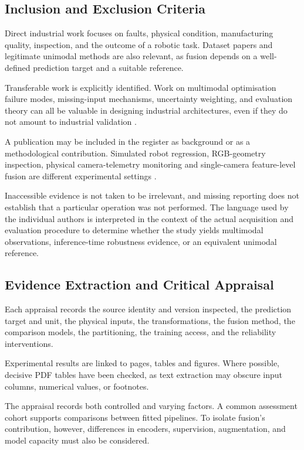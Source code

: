 \subsection{Inclusion and Exclusion Criteria}

Direct industrial work focuses on faults, physical condition, manufacturing quality, inspection, and
the outcome of a robotic task. Dataset papers and legitimate unimodal methods are also relevant, as
fusion depends on a well-defined prediction target and a suitable reference.

Transferable work is explicitly identified. Work on multimodal optimisation failure modes,
missing-input mechanisms, uncertainty weighting, and evaluation theory can all be valuable in
designing industrial architectures, even if they do not amount to industrial validation
\citep{Wang2020What,P016,P023,Bengio2004CVVariance}.

A publication may be included in the register as background or as a methodological contribution.
Simulated robot regression, RGB-geometry inspection, physical camera-telemetry monitoring and
single-camera feature-level fusion are different experimental settings
\citep{Altinses2023Fuzzy,P026,Thoduka2024Handover,P035}.

Inaccessible evidence is not taken to be irrelevant, and missing reporting does not establish that a
particular operation was not performed. The language used by the individual authors is interpreted
in the context of the actual acquisition and evaluation procedure to determine whether the study
yields multimodal observations, inference-time robustness evidence, or an equivalent unimodal
reference.

\subsection{Evidence Extraction and Critical Appraisal}

Each appraisal records the source identity and version inspected, the prediction target and unit,
the physical inputs, the transformations, the fusion method, the comparison models, the
partitioning, the training access, and the reliability interventions.

Experimental results are linked to pages, tables and figures. Where possible, decisive PDF tables
have been checked, as text extraction may obscure input columns, numerical values, or footnotes.

The appraisal records both controlled and varying factors. A common assessment cohort supports
comparisons between fitted pipelines. To isolate fusion's contribution, however, differences in
encoders, supervision, augmentation, and model capacity must also be considered.

